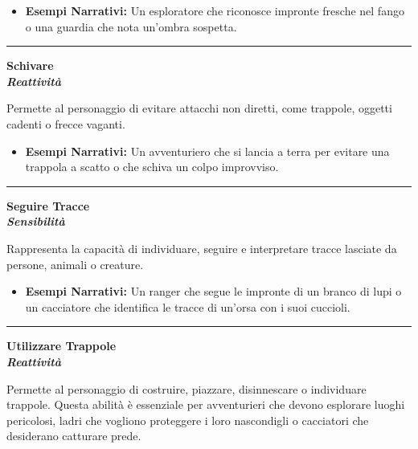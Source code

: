 \documentclass[../manuale_main.tex]{subfiles}
\begin{document}
\begin{itemize}
\item \textbf{Esempi Narrativi:} Un esploratore che riconosce impronte fresche nel fango o una guardia che nota un'ombra sospetta.
\end{itemize}

\vspace{0.5cm}\rule{\textwidth}{0.4pt}\vspace{0.5cm}

\begin{center}
\textbf{\large{Schivare}}\\ \textit{\textbf{Reattività}}\\
\end{center}
Permette al personaggio di evitare attacchi non diretti, come trappole, oggetti cadenti o frecce vaganti.

\begin{itemize}
\item \textbf{Esempi Narrativi:} Un avventuriero che si lancia a terra per evitare una trappola a scatto o che schiva un colpo improvviso.
\end{itemize}

\vspace{0.5cm}\rule{\textwidth}{0.4pt}\vspace{0.5cm}

\begin{center}
\textbf{\large{Seguire Tracce}}\\ \textit{\textbf{Sensibilità}}\\
\end{center}
Rappresenta la capacità di individuare, seguire e interpretare tracce lasciate da persone, animali o creature.

\begin{itemize}
\item \textbf{Esempi Narrativi:} Un ranger che segue le impronte di un branco di lupi o un cacciatore che identifica le tracce di un'orsa con i suoi cuccioli.
\end{itemize}

\vspace{0.5cm}\rule{\textwidth}{0.4pt}\vspace{0.5cm}

\begin{center}
\textbf{\large{Utilizzare Trappole}}\\ \textit{\textbf{Reattività}}\\
\end{center}
Permette al personaggio di costruire, piazzare, disinnescare o individuare trappole. Questa abilità è essenziale per avventurieri che devono esplorare luoghi pericolosi, ladri che vogliono proteggere i loro nascondigli o cacciatori che desiderano catturare prede.
\end{document}

